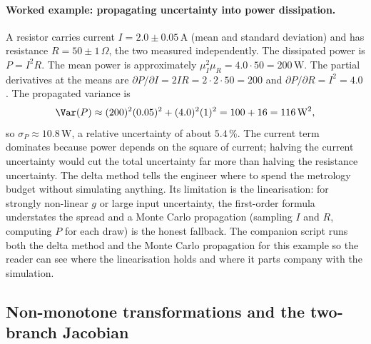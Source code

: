 \paragraph{Worked example: propagating uncertainty into power
dissipation.} A resistor carries current $I = 2.0 \pm 0.05\,
\text{A}$ (mean and standard deviation) and has resistance
$R = 50 \pm 1\,\Omega$, the two measured independently. The
dissipated power is $P = I^{2} R$. The mean power is approximately
$\mu_{I}^{2} \mu_{R} = 4.0 \cdot 50 = 200\,\text{W}$. The partial
derivatives at the means are $\partial P / \partial I = 2 I R =
2 \cdot 2 \cdot 50 = 200$ and $\partial P / \partial R = I^{2} =
4.0$. The propagated variance is
\[
\Var(P) \approx (200)^{2}(0.05)^{2} + (4.0)^{2}(1)^{2}
= 100 + 16 = 116\,\text{W}^{2},
\]
so $\sigma_{P} \approx 10.8\,\text{W}$, a relative uncertainty of
about $5.4\,\%$. The current term dominates because power depends on
the square of current; halving the current uncertainty would cut
the total uncertainty far more than halving the resistance
uncertainty. The delta method tells the engineer where to spend the
metrology budget without simulating anything. Its limitation is the
linearisation: for strongly non-linear $g$ or large input
uncertainty, the first-order formula understates the spread and a
Monte Carlo propagation (sampling $I$ and $R$, computing $P$ for
each draw) is the honest fallback. The companion script
runs both the delta method and the Monte Carlo propagation for this
example so the reader can see where the linearisation holds and where
it parts company with the simulation.

\subsection{Non-monotone transformations and the two-branch Jacobian}

